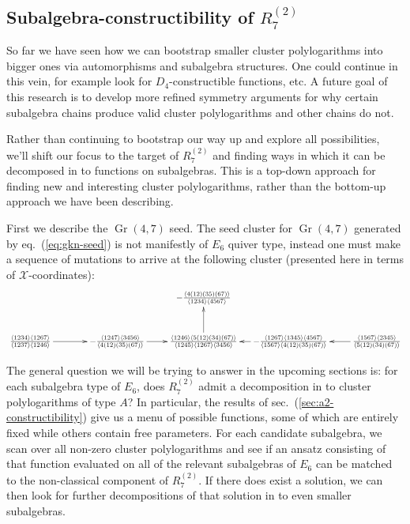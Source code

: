 \documentclass[11pt]{article}
\DeclareMathOperator{\Gr}{Gr}
\def\xcoords{$\mathcal{X}$-coordinates}
\def\pdfeq#1{\texorpdfstring{$#1$}{a}}
\begin{document}
\subsection{Subalgebra-constructibility of \pdfeq{R^{(2)}_7}}

So far we have seen how we can bootstrap smaller cluster polylogarithms into bigger ones via automorphisms and subalgebra structures. One could continue in this vein, for example look for $D_4$-constructible functions, etc. A future goal of this research is to develop more refined symmetry arguments for why certain subalgebra chains produce valid cluster polylogarithms and other chains do not. 

Rather than continuing to bootstrap our way up and explore all possibilities, we'll shift our focus to the target of $R^{(2)}_7$ and finding ways in which it can be decomposed in to functions on subalgebras. This is a top-down approach for finding new and interesting cluster polylogarithms, rather than the bottom-up approach we have been describing. 

First we describe the $\Gr(4,7)$ seed. The seed cluster for $\Gr(4,7)$ generated by eq.~(\ref{eq:gkn-seed}) is not manifestly of $E_6$ quiver type, instead one must make a sequence of mutations to arrive at the following cluster (presented here in terms of \xcoords):
\begin{equation}\label{eq:g47-seed}
\begin{gathered}
\begin{xy} 0;<1pt,0pt>:<0pt,-1pt>::
	(0,50) *+{\frac{\langle 1234\rangle  \langle 1267\rangle }{\langle
   		1237\rangle  \langle 1246\rangle }} ="1",
	(100,50) *+{-\frac{\langle 1247\rangle  \langle 3456\rangle
 	  	}{\langle 4(12)(35)(67)\rangle }} ="2",
	(200,50) *+{\frac{\langle 1246\rangle  \langle 5(12)(34)(67)\rangle
 	  	}{\langle 1245\rangle  \langle 1267\rangle  \langle
   		3456\rangle }} ="3",
	(200,0) *+{-\frac{\langle 4(12)(35)(67)\rangle }{\langle
   		1234\rangle  \langle 4567\rangle }} ="4",
	(300,50) *+{-\frac{\langle 1267\rangle  \langle 1345\rangle  \langle
   		4567\rangle }{\langle 1567\rangle  \langle
   		4(12)(35)(67)\rangle }} ="5",
	(400,50) *+{\frac{\langle 1567\rangle  \langle 2345\rangle }{\langle
   		5(12)(34)(67)\rangle }} ="6",
	"1", {\ar"2"},
	"2", {\ar"3"},
	"3", {\ar"4"},
	"5", {\ar"3"},
	"6", {\ar"5"},
\end{xy}
\end{gathered}
\end{equation}

The general question we will be trying to answer in the upcoming sections is: for each subalgebra type of $E_6$, does $R^{(2)}_7$ admit a decomposition in to cluster polylogarithms of type $A$? In particular, the results of sec.~(\ref{sec:a2-constructibility}) give us a menu of possible functions, some of which are entirely fixed while others contain free parameters. For each candidate subalgebra, we scan over all non-zero cluster polylogarithms and see if an ansatz consisting of that function evaluated on all of the relevant subalgebras of $E_6$ can be matched to the non-classical component of $R^{(2)}_7$. If there does exist a solution, we can then look for further decompositions of that solution in to even smaller subalgebras. 
\end{document}
